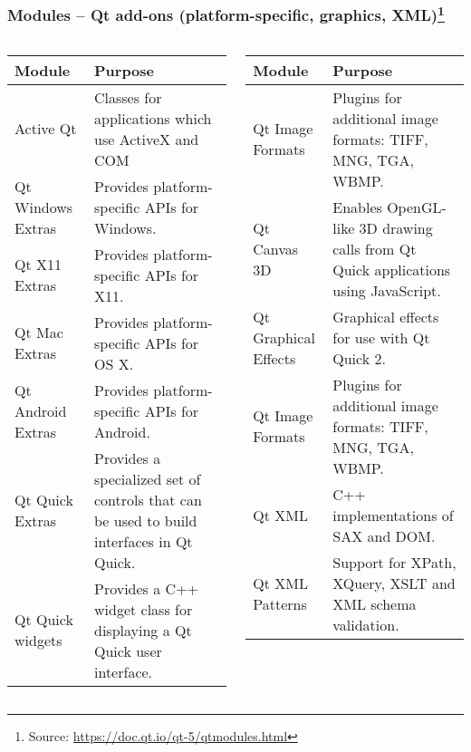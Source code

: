 \begin{frame}
  \frametitle{Modules -- Qt add-ons (platform-specific, graphics, XML)\footnote
  {\tiny Source: \url{https://doc.qt.io/qt-5/qtmodules.html}}}

  \tiny
  \begin{columns}
    \begin{column}{0.48\textwidth}
      \begin{tabular}{|p{}|p{}|}
      \hline
      \textbf{Module} & \textbf{Purpose} \\
      \hline
      Active Qt & Classes for applications which use ActiveX and COM \\
      \hline
      Qt Windows Extras & Provides platform-specific APIs for Windows. \\
      \hline
      Qt X11 Extras & Provides platform-specific APIs for X11. \\
      \hline
      Qt Mac Extras & Provides platform-specific APIs for OS X. \\
      \hline
      Qt Android Extras & Provides platform-specific APIs for Android. \\
      \hline
      Qt Quick Extras & Provides a specialized set of controls that can be
      used to build interfaces in Qt Quick.\\
      \hline
      Qt Quick widgets & Provides a C++ widget class for displaying a Qt Quick
      user interface. \\
      \hline
      \end{tabular}
    \end{column}
    \begin{column}{0.48\textwidth}
      \begin{tabular}{|p{}|p{}|}
      \hline
      \textbf{Module} & \textbf{Purpose} \\
      \hline
      Qt Image Formats & Plugins for additional image formats: TIFF, MNG, TGA, WBMP. \\
      \hline
      Qt Canvas 3D & Enables OpenGL-like 3D drawing calls from Qt Quick applications using JavaScript. \\
      \hline
      Qt Graphical Effects & Graphical effects for use with Qt Quick 2. \\
      \hline
      Qt Image Formats & Plugins for additional image formats: TIFF, MNG, TGA, WBMP. \\
      \hline
      Qt XML & C++ implementations of SAX and DOM.\\
      \hline
      Qt XML Patterns & Support for XPath, XQuery, XSLT and XML schema validation. \\
      \hline
      \end{tabular}
    \end{column}
  \end{columns}
\end{frame}

